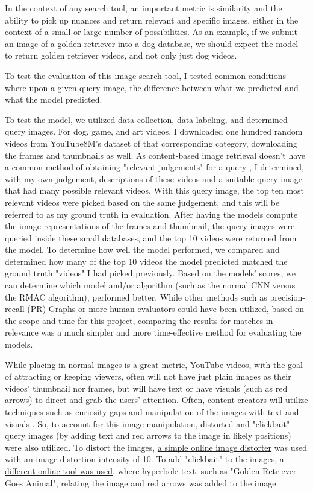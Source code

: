 \documentclass[10pt,twocolumn]{article}
\begin{document}
In the context of any search tool, an important metric is similarity and the ability to pick up nuances and return relevant and specific images, either in the context of a small or large number of possibilities. As an example, if we submit an image of a golden retriever into a dog database, we should expect the model to return golden retriever videos, and not only just dog videos.

To test the evaluation of this image search tool, I tested common conditions where upon a given query image, the difference between what we predicted and what the model predicted.

To test the model, we utilized data collection, data labeling, and determined query images. For dog, game, and art videos, I downloaded one hundred random videos from YouTube8M's dataset of that corresponding category, downloading the frames and thumbnails as well. As content-based image retrieval doesn't have a common method of obtaining "relevant judgements" for a query \cite{Muller2001 TODO}, I determined, with my own judgement, descriptions of these videos and a suitable query image that had many possible relevant videos. With this query image, the top ten most relevant videos were picked based on the same judgement, and this will be referred to as my ground truth in evaluation. After having the models compute the image representations of the frames and thumbnail, the query images were queried inside these small databases, and the top 10 videos were returned from the model. To determine how well the model performed, we compared and determined how many of the top 10 videos the model predicted matched the ground truth "videos" I had picked previously. Based on the models' scores, we can determine which model and/or algorithm (such as the normal CNN versus the RMAC algorithm), performed better. While other methods such as precision-recall (PR) Graphs \cite{Muller2001 TODO} or more human evaluators could have been utilized, based on the scope and time for this project, comparing the results for matches in relevance was a much simpler and more time-effective method for evaluating the models.

While placing in normal images is a great metric, YouTube videos, with the goal of attracting or keeping viewers, often will not have just plain images as their videos' thumbnail nor frames, but will have text or have visuals (such as red arrows) to direct and grab the users' attention. Often, content creators will utilize techniques such as curiosity gaps and manipulation of the images with text and visuals \cite{Mowar2021}. So, to account for this image manipulation, distorted and "clickbait" query images (by adding text and red arrows to the image in likely positions) were also utilized. To distort the images, \href{https://www.imgonline.com.ua/eng/picture-distortion.php}{a simple online image distorter} was used with an image distortion intensity of 10. To add "clickbait" to the images, \href{https://www.visualwatermark.com/add-text-to-photos/}{a different online tool was used}, where hyperbole text, such as "Golden Retriever Goes Animal", relating the image and red arrows was added to the image.
\end{document}
